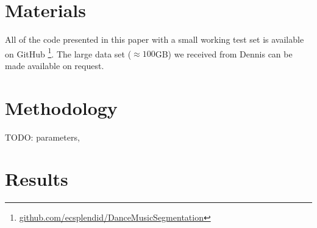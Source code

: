 \documentclass[twocolumn]{article}
\begin{document}
\section{Materials}

All of the code presented in this paper with a small working test set is available on GitHub \footnote{\url{github.com/ecsplendid/DanceMusicSegmentation}}. The large data set ($\approx100$GB) we received from Dennis can be made available on request.


\section{Methodology}

TODO: parameters, 


\section{Results}
\end{document}
